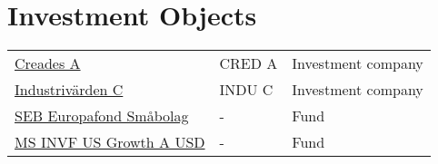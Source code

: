 \documentclass[A4]{article}
\title{\documenttitle}
\date{\today}
\author{Frans Englich \\
        \href{mailto:fenglich@fastmail.fm}{fenglich@fastmail.fm}}
\begin{document}
\maketitle

\section{Investment Objects}

\begin{center}
\begin{tabular}{ |l|l|l| }
 \hline
    \href{https://www.avanza.se/aktier/omc-aktien.html/338588/creades-a}{Creades A} & CRED A & Investment company\\
    \href{https://www.avanza.se/aktier/om-aktien.html/5245/industrivarden-c}{Industrivärden C} & INDU C & Investment company\\
    \href{https://www.avanza.se/fonder/om-fonden.html/929/seb-europafond-smabolag}{SEB Europafond Småbolag} & - & Fund \\
    \href{https://www.avanza.se/fonder/om-fonden.html/70331/ms-invf-us-growth-a-usd}{MS INVF US Growth A USD} & - & Fund \\
 \hline
\end{tabular}
\end{center}
\end{document}

